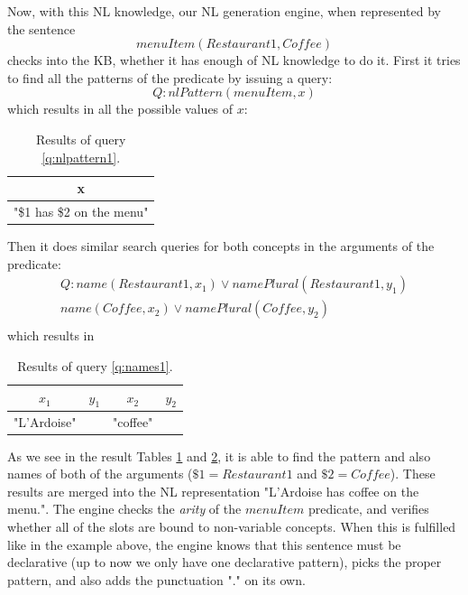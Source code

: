 Now, with this NL knowledge, our NL generation engine, when represented by
the sentence 
\begin{equation}
\label{nl:menuItem1}
menuItem(Restaurant1,Coffee)
\end{equation}
checks into the KB, whether it 
has enough of NL knowledge to do it. First it tries to find all the patterns
of the predicate by issuing a query:
\begin{equation}\label{q:nlpattern1}
Q:nlPattern(menuItem,x)
\end{equation}
which results in all the possible values of $x$:
\begin{table}[H]
\centering
\caption{Results of query \ref{q:nlpattern1}.}
\label{tab:results1}
\begin{tabular}{|c|}
	\hline
	\textbf{x} \\
    \hline
    "\$1 has \$2 on the menu" \\
    \hline
\end{tabular}
\end{table}
Then it does similar search queries for both concepts in the arguments
of the predicate:
\begin{equation}\label{q:names1}
\begin{gathered}
Q:name(Restaurant1,x_1) \lor namePlural(Restaurant1,y_1)\\
name(Coffee,x_2) \lor namePlural(Coffee,y_2)\\
\end{gathered}
\end{equation}
which results in
\begin{table}[H]
\centering
\caption{Results of query \ref{q:names1}.}
\label{tab:results2}
\begin{tabular}{|c|c|c|c|}
	\hline
	\textbf{$x_1$} & \textbf{$y_1$} & \textbf{$x_2$} & \textbf{$y_2$}\\
    \hline
    "L'Ardoise" & & "coffee" & \\
    \hline
\end{tabular}
\end{table}
As we see in the result Tables \ref{tab:results1} and \ref{tab:results2}, it
is able to find the pattern and also names of both of the arguments 
($\$1=Restaurant1$ and $\$2=Coffee$). These results are merged into the 
NL representation "L'Ardoise has coffee on the menu.". 
The engine checks the \emph{arity} of the $menuItem$ predicate,
and verifies whether all of the slots are bound to non-variable concepts. When
this is fulfilled like in the example above, the engine knows that this 
sentence must be declarative (up to now we only have one declarative pattern), 
picks the proper pattern, and also adds the punctuation "." on its own.


